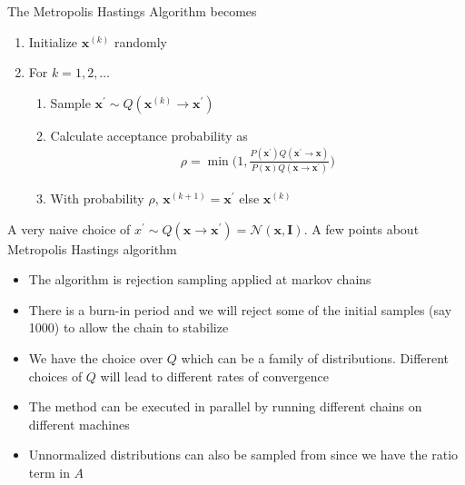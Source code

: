 \documentclass[../../statistical_learning_notes.tex]{subfiles}
\begin{document}
The Metropolis Hastings Algorithm becomes
\begin{enumerate}
    \item Initialize $\bm{x}^{(k)}$ randomly
    \item For $k = 1, 2, \ldots$
    \begin{enumerate}
        \item Sample $\bm{x}^{\prime} \sim Q(\bm{x}^{(k)} \rightarrow \bm{x}^{\prime})$
        \item Calculate acceptance probability as
        \begin{align*}
            \rho = \min \bigg(1, \frac{P(\bm{x}^{\prime})Q(\bm{x}^{\prime} \rightarrow \bm{x})}{P(\bm{x})Q(\bm{x} \rightarrow \bm{x}^{\prime})} \bigg)
        \end{align*}
        \item With probability $\rho$, $\bm{x}^{(k+1)} = \bm{x}^{\prime}$ else $\bm{x}^{(k)}$
    \end{enumerate}
\end{enumerate}

A very naive choice of $x^{\prime} \sim Q(\bm{x} \rightarrow \bm{x}^{\prime}) = \mathcal{N}(\bm{x}, \bm{I})$. A few points about Metropolis Hastings algorithm
\begin{itemize}
    \item The algorithm is rejection sampling applied at markov chains
    \item There is a burn-in period and we will reject some of the initial samples (say 1000) to allow the chain to stabilize
    \item We have the choice over $Q$ which can be a family of distributions. Different choices of $Q$ will lead to different rates of convergence
    \item The method can be executed in parallel by running different chains on different machines
    \item Unnormalized distributions can also be sampled from since we have the ratio term in $A$
\end{itemize}
\end{document}
